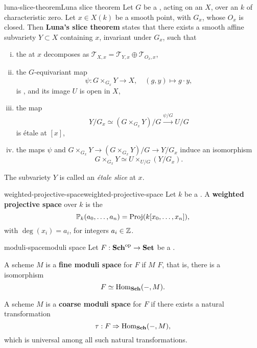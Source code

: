 \begin{topic}{luna-slice-theorem}{Luna slice theorem}
    Let $G$ be a  , acting on an  $X$, over an  $k$ of characteristic zero. Let $x \in X(k)$ be a smooth point, with  $G_x$, whose  $O_x$ is closed. Then \textbf{Luna's slice theorem} states that there exists a smooth affine subvariety $Y \subset X$ containing $x$, invariant under $G_x$, such that
    \begin{enumerate}[(i)]
        \item the  at $x$ decomposes as $\mathcal{T}_{X, x} = \mathcal{T}_{Y, x} \oplus \mathcal{T}_{O_x, x}$,
        \item the $G$-equivariant map
        \[ \psi : G \times_{G_x} Y \to X, \quad (g, y) \mapsto g \cdot y , \]
        is , and its image $U$ is open in $X$,
        \item the map
        \[ Y/G_x \simeq (G \times_{G_x} Y) / G \xrightarrow{\psi / G} U / G \]
        is étale at $[x]$,
        \item the maps $\psi$ and $G \times_{G_x} Y \to (G \times_{G_x} Y) / G \to Y / G_x$ induce an isomorphism
        \[ G \times_{G_x} Y \simeq U \times_{U/G} (Y/G_x) . \]
    \end{enumerate}
    The subvariety $Y$ is called an \textit{étale slice} at $x$.
\end{topic}

\begin{topic}{weighted-projective-space}{weighted-projective-space}
    Let $k$ be a . A \textbf{weighted projective space} over $k$ is the 
    \[ \mathbb{P}_k(a_0, \ldots, a_n) = \textup{Proj}(k[x_0, \ldots, x_n]) , \]
    with $\deg(x_i) = a_i$, for integers $a_i \in \mathbb{Z}$.
\end{topic}

\begin{topic}{moduli-space}{moduli space}
    Let $F : \textbf{Sch}^\textup{op} \to \textbf{Set}$ be a .
    
    A scheme $M$ is a \textbf{fine moduli space} for $F$ if $M$  $F$, that is, there is a  isomorphism
    \[ F \simeq \text{Hom}_\textbf{Sch}(-, M) . \]
    
    A scheme $M$ is a \textbf{coarse moduli space} for $F$ if there exists a natural transformation
    \[ \tau : F \Rightarrow \text{Hom}_\textbf{Sch}(-, M) , \]
    which is universal among all such natural transformations.
\end{topic}
